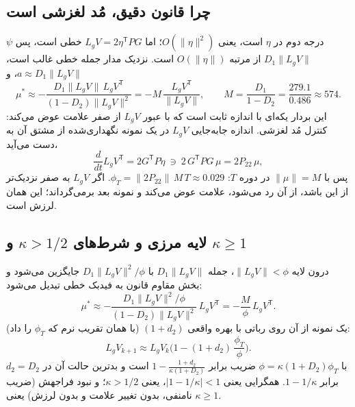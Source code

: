 \documentclass[10pt,twocolumn]{article}
\begin{document}
\subsection{چرا قانون دقیق، مُد لغزشی است}
$\psi$ درجه دوم در $\eta$ است، یعنی $O(\|\eta\|^2)$؛ اما $L_gV=2\eta^{\mathsf T}PG$ خطی است،
پس $D_1\|L_gV\|$ از مرتبه $O(\|\eta\|)$ است. نزدیک مدار جمله خطی غالب است،
$a\approx D_1\|L_gV\|$، و
\begin{equation*}
    \mu^*\approx-\frac{D_1\|L_gV\|\,L_gV^{\mathsf T}}{(1-D_2)\|L_gV\|^2}
    =-M\,\frac{L_gV^{\mathsf T}}{\|L_gV\|},\qquad
    M=\frac{D_1}{1-D_2}=\frac{279.1}{0.486}\approx574 .
\end{equation*}
این بردار یکه‌ای با اندازه ثابت است که با عبور $L_gV$ از صفر علامت عوض می‌کند: کنترل
مُد لغزشی. اندازه جابه‌جایی $L_gV$ در یک نمونه نگهداری‌شده از مشتق آن به دست می‌آید،
\begin{equation*}
    \frac{d}{dt}L_gV^{\mathsf T}=2G^{\mathsf T}P\dot\eta\ \ni\ 2\,G^{\mathsf T}PG\,\mu=2P_{22}\,\mu ,
\end{equation*}
پس با $\|\mu\|=M$ در دوره $T$:
$\phi_T=\|2P_{22}\|\,M\,T\approx0.029$. اگر $L_gV$ به صفر نزدیک‌تر از این باشد، از
آن رد می‌شود، علامت عوض می‌کند و نمونه بعد برمی‌گرداند؛ این همان لرزش است.

\subsection{لایه مرزی و شرط‌های $\kappa>1/2$ و $\kappa\ge1$}
درون لایه $\|L_gV\|<\phi$، جمله $D_1\|L_gV\|$ با $D_1\|L_gV\|^2/\phi$ جایگزین می‌شود و
بخش مقاوم قانون به فیدبک خطی تبدیل می‌شود:
\begin{equation*}
    \mu^*\approx-\frac{D_1\|L_gV\|^2/\phi}{(1-D_2)\|L_gV\|^2}\,L_gV^{\mathsf T}
    =-\frac{M}{\phi}\,L_gV^{\mathsf T}.
\end{equation*}
یک نمونه از آن روی رباتی با بهره واقعی $(1+d_2)$ (با همان تقریب نرم که $\phi_T$ را داد):
\begin{equation*}
    L_gV_{k+1}\approx L_gV_k\Big(1-(1+d_2)\,\frac{\phi_T}{\phi}\Big).
\end{equation*}
با $\phi=\kappa(1+D_2)\phi_T$ ضریب برابر $1-\frac{1+d_2}{\kappa(1+D_2)}$ است و بدترین حالت
آن در $d_2=D_2$ برابر $1-1/\kappa$. همگرایی یعنی $|1-1/\kappa|<1$، یعنی
$\kappa>1/2$؛ و نبود فراجهش (ضریب نامنفی، بدون تغییر علامت و بدون لرزش) یعنی
$\kappa\ge1$.
\end{document}
